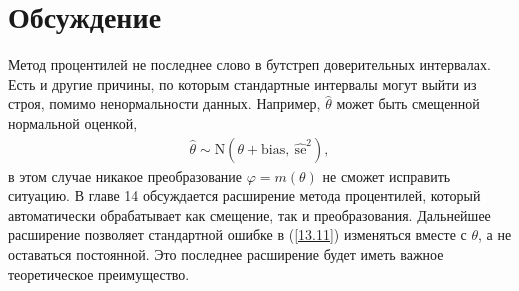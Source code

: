 \section{Обсуждение}
Метод процентилей не последнее слово в бутстреп доверительных интервалах. Есть и другие причины, по которым стандартные интервалы могут выйти из строя, помимо ненормальности данных. Например, $\widehat{\theta}$ может быть смещенной нормальной оценкой,
\begin{gather}\label{13.11}
\widehat{\theta} \sim \mathrm{N}(\theta+\text{bias},\  \widehat{\text{se}}^{2}),
\end{gather}
в этом случае никакое преобразование $\varphi = m(\theta)$ не сможет исправить ситуацию. В главе 14 обсуждается расширение метода процентилей, который автоматически обрабатывает как смещение, так и преобразования. Дальнейшее расширение позволяет стандартной ошибке в (\ref{13.11}) изменяться вместе с $\theta$, а не оставаться постоянной. Это последнее расширение будет иметь важное теоретическое преимущество.

